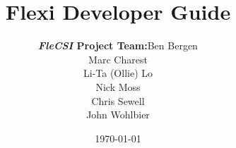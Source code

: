
\title{\textbf{Flexi Developer Guide}}
\date{\today}
\author{\begin{tabular}{rl}
        \textbf{\emph{FleCSI} Project Team:} & Ben Bergen \\
                                     & Marc Charest \\
                                     & Li-Ta (Ollie) Lo \\
                                     & Nick Moss \\
                                     & Chris Sewell \\
                                     & John Wohlbier
        \end{tabular}}

